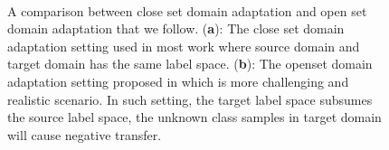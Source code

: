 
\begin{figure}[!ht]
    \centering
     \\
    \caption{
        A comparison between close set domain adaptation and open set domain adaptation that we follow. 
        (\textbf{a}): The close set domain adaptation setting used in most work where source domain and target domain has the same label space. 
        (\textbf{b}): The openset domain adaptation setting proposed in \cite{OpensetDA-bp} which is more challenging and realistic scenario. In such setting, the target label space subsumes the source label space, the unknown class samples in target domain will cause negative transfer.
    } 
    \label{figure: openset} 
\end{figure}

